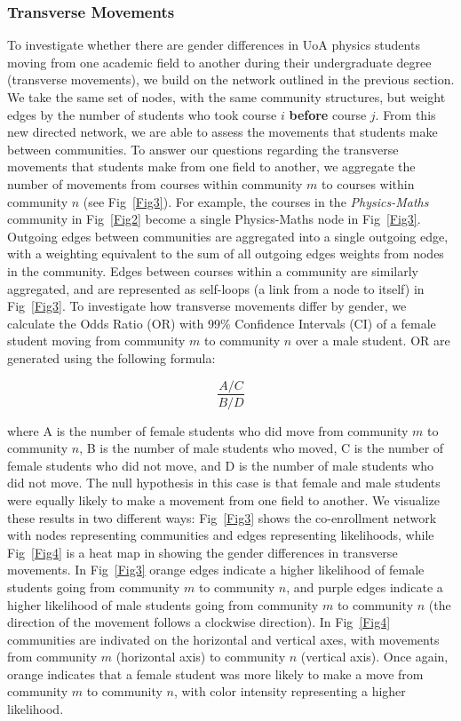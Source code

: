 \subsubsection{Transverse Movements}
To investigate whether there are gender differences in UoA physics students moving from one academic field to another during their undergraduate degree (transverse movements), we build on the network outlined in the previous section. We take the same set of nodes, with the same community structures, but weight edges by the number of students who took course $i$ \textbf{before} course $j$. From this new directed network, we are able to assess the movements that students make between communities. To answer our questions regarding the transverse movements that students make from one field to another, we aggregate the number of movements from courses within community $m$ to courses within community $n$ (see Fig~\ref{Fig3}). For example, the courses in the \textit{Physics-Maths} community in Fig~\ref{Fig2} become a single Physics-Maths node in Fig~\ref{Fig3}. Outgoing edges between communities are aggregated into a single outgoing edge, with a weighting equivalent to the sum of all outgoing edges weights from nodes in the community. Edges between courses within a community are similarly aggregated, and are represented as self-loops (a link from a node to itself) in Fig~\ref{Fig3}. To investigate how transverse movements differ by gender, we calculate the Odds Ratio (OR) with 99\% Confidence Intervals (CI) of a female student moving from community $m$ to community $n$ over a male student. OR are generated using the following formula\cite{field2012discovering}: 

    $$\frac{A/C}{B/D}$$

where A is the number of female students who did move from community $m$ to community $n$, B is the number of male students who moved, C is the number of female students who did not move, and D is the number of male students who did not move. The null hypothesis in this case is that female and male students were equally likely to make a movement from one field to another. We visualize these results in two different ways: Fig~\ref{Fig3} shows the co-enrollment network with nodes representing communities and edges representing likelihoods, while Fig~\ref{Fig4} is a heat map in showing the gender differences in transverse movements. In Fig~\ref{Fig3} orange edges indicate a higher likelihood of female students going from community $m$ to community $n$, and purple edges indicate a higher likelihood of male students going from community $m$ to community $n$ (the direction of the movement follows a clockwise direction).  In Fig~\ref{Fig4} communities are indivated on the horizontal and vertical axes, with movements from community $m$ (horizontal axis) to community $n$ (vertical axis). Once again, orange indicates that a female student was more likely to make a move from community $m$ to community $n$, with color intensity representing a higher likelihood. 

